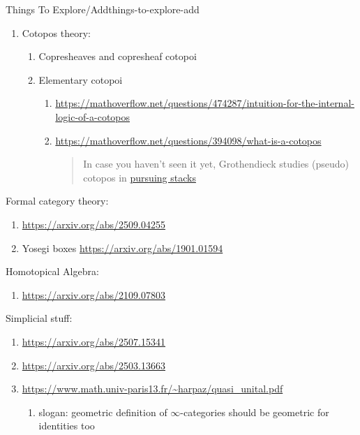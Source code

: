 \begin{remark}{Things To Explore/Add}{things-to-explore-add}
\begin{enumerate}
\begin{enumerate}
                \item \url{https://arxiv.org/abs/2405.19529}
            \end{enumerate}
        \item Cotopos theory:
            \begin{enumerate}
                \item Copresheaves and copresheaf cotopoi
                \item Elementary cotopoi
                    \begin{enumerate}
                        \item \url{https://mathoverflow.net/questions/474287/intuition-for-the-internal-logic-of-a-cotopos}
                        \item \url{https://mathoverflow.net/questions/394098/what-is-a-cotopos}
                            \begin{quote}
                                In case you haven’t seen it yet, Grothendieck studies (pseudo) cotopos in \href{n case you haven’t seen it yet, Grothendieck studies (pseudo) cotopos in pursuing stacks}{pursuing stacks}
                            \end{quote}
                    \end{enumerate}
            \end{enumerate}
    \end{enumerate}
    Formal category theory:
    \begin{enumerate}
        \item \url{https://arxiv.org/abs/2509.04255}
        \item Yosegi boxes \url{https://arxiv.org/abs/1901.01594}
    \end{enumerate}
    Homotopical Algebra:
    \begin{enumerate}
        \item \url{https://arxiv.org/abs/2109.07803}
    \end{enumerate}
    Simplicial stuff:
    \begin{enumerate}
        \item \url{https://arxiv.org/abs/2507.15341}
        \item \url{https://arxiv.org/abs/2503.13663}
        \item \url{https://www.math.univ-paris13.fr/~harpaz/quasi_unital.pdf}
            \begin{enumerate}
                \item slogan: geometric definition of $\infty$-categories should be geometric for identities too

\end{enumerate}
\end{enumerate}
\end{remark}
